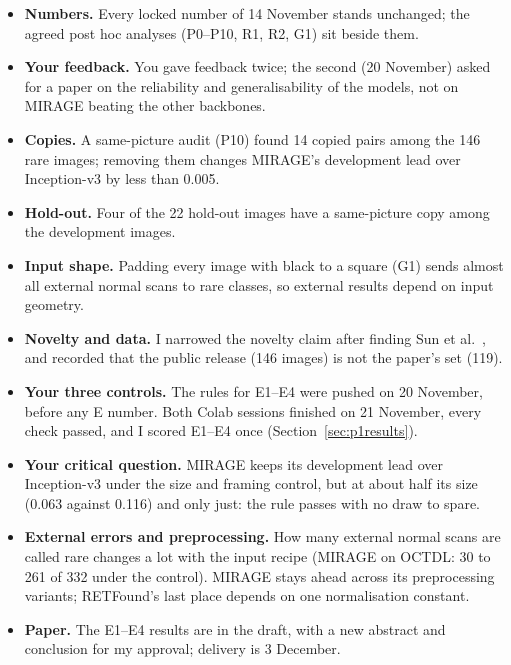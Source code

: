\documentclass[10pt,a4paper]{article}
\begin{document}
\begin{itemize}
  \item \textbf{Numbers.} Every locked number of 14 November stands unchanged; the agreed post hoc analyses
        (P0--P10, R1, R2, G1) sit beside them.
  \item \textbf{Your feedback.} You gave feedback twice; the second (20 November) asked for a paper on the
        reliability and generalisability of the models, not on MIRAGE beating the other backbones.
  \item \textbf{Copies.} A same-picture audit (P10) found 14 copied pairs among the 146 rare images; removing
        them changes MIRAGE's development lead over Inception-v3 by less than 0.005.
  \item \textbf{Hold-out.} Four of the 22 hold-out images have a same-picture copy among the development images.
  \item \textbf{Input shape.} Padding every image with black to a square (G1) sends almost all external normal
        scans to rare classes, so external results depend on input geometry.
  \item \textbf{Novelty and data.} I narrowed the novelty claim after finding Sun et al.\ \cite{sun2024}, and
        recorded that the public release (146 images) is not the paper's set (119).
  \item \textbf{Your three controls.} The rules for E1--E4 were pushed on 20 November, before any E number. Both
        Colab sessions finished on 21 November, every check passed, and I scored E1--E4 once
        (Section~\ref{sec:p1results}).
  \item \textbf{Your critical question.} MIRAGE keeps its development lead over Inception-v3 under the size and
        framing control, but at about half its size (0.063 against 0.116) and only just: the rule passes with
        no draw to spare.
  \item \textbf{External errors and preprocessing.} How many external normal scans are called rare changes a
        lot with the input recipe (MIRAGE on OCTDL: 30 to 261 of 332 under the control). MIRAGE stays ahead
        across its preprocessing variants; RETFound's last place depends on one normalisation constant.
  \item \textbf{Paper.} The E1--E4 results are in the draft, with a new abstract and conclusion for my
        approval; delivery is 3 December.
\end{itemize}
\end{document}
